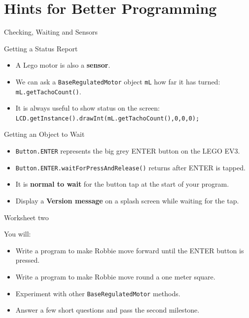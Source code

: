 \documentclass[color=pdftex,usenames,dvipsnames, aspectratio=169]{beamer}
\begin{document}
\section{Hints for Better Programming}
\begin{frame}{Checking, Waiting and Sensors}
\begin{block}{Getting a Status Report}
\begin{itemize}
\item A Lego motor is also a \alert{\textbf{sensor}}.
\item We can ask a \lstinline!BaseRegulatedMotor! object \lstinline!mL! how far it has turned:\\ \lstinline!mL.getTachoCount()!.
\item It is always useful to show status on the screen: \\
	\lstinline!LCD.getInstance().drawInt(mL.getTachoCount(),0,0,0);!
\end{itemize}

\end{block}
\begin{block}{Getting an Object to Wait}
\begin{itemize}
\item \lstinline!Button.ENTER! represents the big grey ENTER button on the LEGO EV3.
\item \lstinline!Button.ENTER.waitForPressAndRelease()! returns after ENTER is tapped.
\item It is \textbf{normal to wait} for the button tap at the start of your program.
\item Display a \textbf{Version message} on a splash screen while waiting for the tap.
\end{itemize}
\end{block}
\end{frame}

\begin{frame}{Worksheet two}
\begin{block}{You will:}
\begin{itemize}
\item Write a program to make Robbie move forward until the ENTER button is pressed.
\item Write a program to make Robbie move round a one meter square.
\item Experiment with other \lstinline!BaseRegulatedMotor! methods.
\item Answer a few short questions and pass the second milestone.
\end{itemize}
\end{block}
\end{frame}
\end{document}
